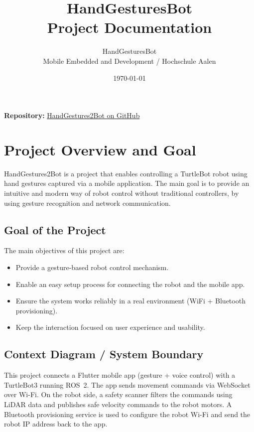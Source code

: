 \documentclass[11pt,a4paper]{article}
\title{\textbf{HandGesturesBot} \\ Project Documentation}
\author{HandGesturesBot \\ Mobile Embedded and Development / Hochschule Aalen}
\date{\today}
\begin{document}
\maketitle
\thispagestyle{empty}
\vspace{1cm}

\begin{center}
\textbf{Repository:} \href{https://github.com/notWetro/HandGestures2Bot.git}{HandGestures2Bot on GitHub}
\end{center}

\newpage
\tableofcontents
\newpage

\section{Project Overview and Goal}
HandGestures2Bot is a project that enables controlling a TurtleBot robot using hand gestures captured via a mobile application.
The main goal is to provide an intuitive and modern way of robot control without traditional controllers, by using gesture recognition and network communication.

\subsection{Goal of the Project}
The main objectives of this project are:
\begin{itemize}[leftmargin=1.5cm]
    \item Provide a gesture-based robot control mechanism.
    \item Enable an easy setup process for connecting the robot and the mobile app.
    \item Ensure the system works reliably in a real environment (WiFi + Bluetooth provisioning).
    \item Keep the interaction focused on user experience and usability.
\end{itemize}

\subsection{Context Diagram / System Boundary}
This project connects a Flutter mobile app (gesture + voice control) with a TurtleBot3 running ROS~2.
The app sends movement commands via WebSocket over Wi-Fi. On the robot side, a safety scanner filters
the commands using LiDAR data and publishes safe velocity commands to the robot motors.
A Bluetooth provisioning service is used to configure the robot Wi-Fi and send the robot IP address back to the app.
\end{document}
